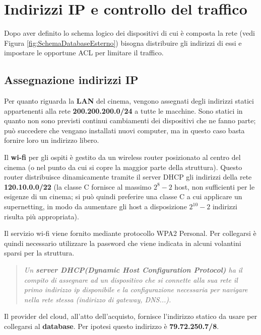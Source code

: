\documentclass{article}
\begin{document}
\section{Indirizzi IP e controllo del traffico}\label{sec:IPeACL}

Dopo aver definito lo schema logico dei dispositivi di cui è composta la rete (vedi Figura \ref{fig:SchemaDatabaseEsterno}) bisogna distribuire gli indirizzi di essi e impostare le opportune ACL per limitare il traffico.

\subsection{Assegnazione indirizzi IP}\label{sec:IndirizziIp}

Per quanto riguarda la \textbf{LAN} del cinema, vengono assegnati degli indirizzi statici appartenenti alla rete \textbf{200.200.200.0/24} a tutte le macchine. Sono statici in quanto non sono previsti continui cambiamenti dei dispositivi che ne fanno parte; può succedere che vengano installati nuovi computer, ma in questo caso basta fornire loro un indirizzo libero.

Il \textbf{wi-fi} per gli ospiti è gestito da un wireless router posizionato al centro del cinema (o nel punto da cui si copre la maggior parte della struttura). Questo router distribuisce dinamicamente tramite il server DHCP gli indirizzi della rete \textbf{120.10.0.0/22} (la classe C fornisce al massimo $2^{8}-2$ host, non sufficienti per le esigenze di un cinema; si può quindi preferire una classe C a cui applicare un supernetting, in modo da aumentare gli host a disposizione $2^{10}-2$ indirizzi risulta più appropriata).

Il servizio wi-fi viene fornito mediante protocollo WPA2 Personal. Per collegarsi è quindi necessario utilizzare la password che viene indicata in alcuni volantini sparsi per la struttura.

\begin{quote}
    \begin{Cit}
    \textit{
    Un \textbf{server DHCP(Dynamic Host Configuration Protocol)} ha il compito di assegnare ad un dispositivo che si connette alla sua rete il primo indirizzo ip disponibile e la configurazione necessaria per navigare nella rete stessa (indirizzo di gateway, DNS...).}
    \end{Cit}
    \end{quote}
    
Il provider del cloud, all'atto dell'acquisto, fornisce l'indirizzo statico da usare per collegarsi al \textbf{database}. Per ipotesi questo indirizzo è \textbf{79.72.250.7/8}.
\end{document}
